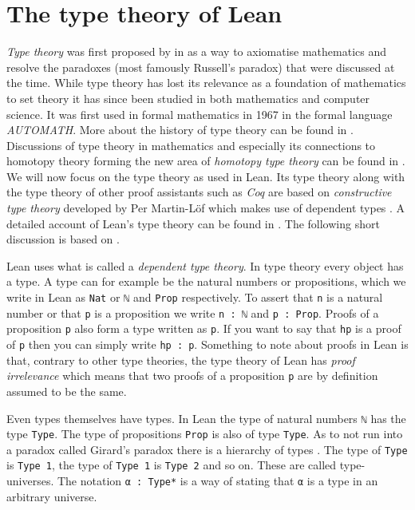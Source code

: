 \section{The type theory of Lean}
\label{sec:typetheory}

\emph{Type theory} was first proposed by  in \citeyear{Russell1908} \cite{Russell1908} as a way to axiomatise mathematics and resolve the paradoxes (most famously Russell's paradox) that were discussed at the time. 
While type theory has lost its relevance as a foundation of mathematics to set theory it has since been studied in both mathematics and computer science. 
It was first used in formal mathematics in 1967 in the formal language \emph{AUTOMATH}. 
More about the history of type theory can be found in \cite{Kamareddine2004}. 
Discussions of type theory in mathematics and especially its connections to homotopy theory forming the new area of \emph{homotopy type theory} can be found in \cite{hottbook}.
We will now focus on the type theory as used in Lean.
Its type theory along with the type theory of other proof assistants such as \emph{Coq} are based on \emph{constructive type theory} developed by Per Martin-Löf which makes use of dependent types \cite{Martin-Löf1984}.
A detailed account of Lean's type theory can be found in \cite{Carneiro2019}. 
The following short discussion is based on \cite{Avigad2024}. 

Lean uses what is called a \emph{dependent type theory}.
In type theory every object has a type. 
A type can for example be the natural numbers or propositions, which we write in Lean as \lstinline{Nat} or \lstinline{ℕ} and \lstinline{Prop} respectively.
To assert that \lstinline{n} is a natural number or that \lstinline{p} is a proposition we write \lstinline{n : ℕ} and \lstinline{p : Prop}. 
Proofs of a proposition \lstinline{p} also form a type written as \lstinline{p}.
If you want to say that \lstinline{hp} is a proof of \lstinline{p} then you can simply write \lstinline{hp : p}.
Something to note about proofs in Lean is that, contrary to other type theories, the type theory of Lean has \emph{proof irrelevance} which means that two proofs of a proposition \lstinline{p} are by definition assumed to be the same.

Even types themselves have types. 
In Lean the type of natural numbers \lstinline{ℕ} has the type \lstinline{Type}. 
The type of propositions \lstinline{Prop} is also of type \lstinline{Type}.
As to not run into a paradox called Girard's paradox there is a hierarchy of types \cite{Coquand1986}. 
The type of \lstinline{Type} is \lstinline{Type 1}, the type of \lstinline{Type 1} is \lstinline{Type 2} and so on.
These are called type-universes. 
The notation \lstinline{α : Type*} is a way of stating that \lstinline{α} is a type in an arbitrary universe.

